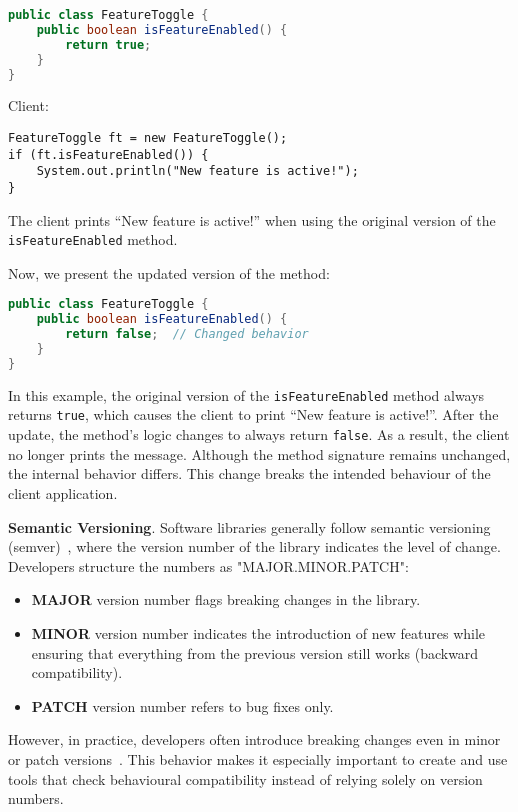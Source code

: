 \begin{itemize}
    \begin{lstlisting}[language=java]
public class FeatureToggle {
    public boolean isFeatureEnabled() {
        return true;
    }
}
    \end{lstlisting}
Client:
\begin{lstlisting}
FeatureToggle ft = new FeatureToggle();
if (ft.isFeatureEnabled()) {
    System.out.println("New feature is active!");
}
\end{lstlisting}
The client prints ``{New feature is active!}'' when using the original version of the \texttt{isFeatureEnabled}
method.

Now, we present the updated version of the method:
\begin{lstlisting}[language=java]
public class FeatureToggle {
    public boolean isFeatureEnabled() {
        return false;  // Changed behavior
    }
}
\end{lstlisting}
In this example, the original version of the \texttt{isFeatureEnabled} method always returns \texttt{true},
which causes the client to print ``{New feature is active!}''. After the update, the method's logic changes
to always return \texttt{false}. As a result, the client no longer prints the message. Although the method
signature remains unchanged, the internal behavior differs. This change breaks the intended behaviour
of the client application.
\end{itemize}

\textbf{Semantic Versioning}. Software libraries generally follow semantic versioning \\(semver)~\cite{preston-werner23:_seman_version}, where the version number of the library indicates the level of change. Developers structure the numbers as "MAJOR.MINOR.PATCH":
\begin{itemize}
    \item \textbf{MAJOR} version number flags breaking changes in the library.
    \item \textbf{MINOR} version number indicates the introduction of new features while ensuring that everything from the previous version still works (backward compatibility).
    \item \textbf{PATCH} version number refers to bug fixes only.
\end{itemize}
However, in practice, developers often introduce breaking changes even in minor or patch versions~\cite{jayasuriya24:_under_apis}. This behavior makes it especially important to create and use tools that check behavioural compatibility instead of relying solely on version numbers.

